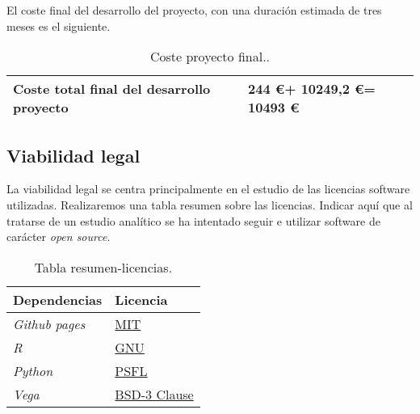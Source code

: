 \begin{description}
	El coste final del desarrollo del proyecto, con una duración estimada de tres meses es el siguiente.  
	
	\begin{table}[htb]
		\begin{center}
			\begin{tabular}{|l|l|}
				\hline
				\textbf{Coste total final del desarrollo proyecto}  &  244 \euro +  10249,2 \euro = 10493 \euro   \\ \hline
			\end{tabular}
			\caption{Coste proyecto final..}
			\label{tabla:costefinal}
		\end{center}
	\end{table}
	
\end{description}

\subsection{Viabilidad legal}\label{viabilidad-legal}
La viabilidad legal se centra principalmente en el estudio de las licencias software utilizadas. Realizaremos una tabla resumen sobre las licencias. Indicar aquí que al tratarse de un estudio analítico se ha intentado seguir e utilizar software de carácter \textit{open source}.

\begin{table}[H]
	\begin{center}
		\begin{tabular}{|l|l|}
			\hline
			Dependencias & Licencia \\
			\hline \hline
			\emph{Github pages} & \href{https://opensource.org/licenses/MIT}{MIT}\\ \hline
			\emph{R} & \href{https://en.wikipedia.org/wiki/GNU_General_Public_License#Version_2}{GNU}\\ \hline
			\emph{Python} & \href{https://es.wikipedia.org/wiki/Python_Software_Foundation_License}{PSFL}\\ \hline
			\emph{Vega} & \href{https://github.com/vega/vega/blob/master/LICENSET}{BSD-3 Clause}\\ \hline
			
		\end{tabular}
		\caption{Tabla resumen-licencias.}
		\label{tabla:licencias}
	\end{center}
\end{table}



